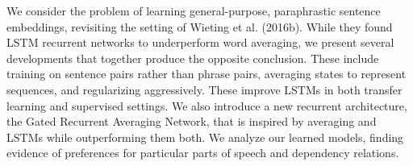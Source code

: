 We consider the problem of learning general-purpose, paraphrastic sentence embeddings, revisiting the setting of Wieting et al. (2016b). While they found LSTM recurrent networks to underperform word averaging, we present several developments that together produce the opposite conclusion. These include training on sentence pairs rather than phrase pairs, averaging states to represent sequences, and regularizing aggressively. These improve LSTMs in both transfer learning and supervised settings. We also introduce a new recurrent architecture, the Gated Recurrent Averaging Network, that is inspired by averaging and LSTMs while outperforming them both. We analyze our learned models, finding evidence of preferences for particular parts of speech and dependency relations.

